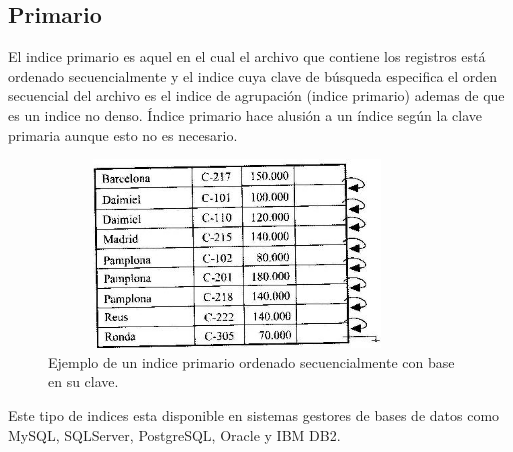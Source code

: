 \documentclass[12pt, titlepage]{article}
\begin{document}
	\subsection{Primario}
	El indice primario es aquel en el cual el archivo que contiene los registros está ordenado secuencialmente y el indice cuya clave de búsqueda especifica el orden secuencial del archivo es el indice de agrupación (indice primario) ademas de que es un indice no denso. Índice primario hace alusión a un índice según la clave primaria aunque esto no es necesario.
	\begin{figure}[H]
		\begin{center}
			\includegraphics[width=10cm, height=5cm]{img/indiceprimario.jpg}
			\caption{Ejemplo de un indice primario ordenado secuencialmente con base en su clave.}
			\label{fig:hasta-use2}
		\end{center}
	\end{figure}
Este tipo de indices esta disponible en sistemas gestores de bases de datos como MySQL, SQLServer, PostgreSQL, Oracle y IBM DB2.
\end{document}
